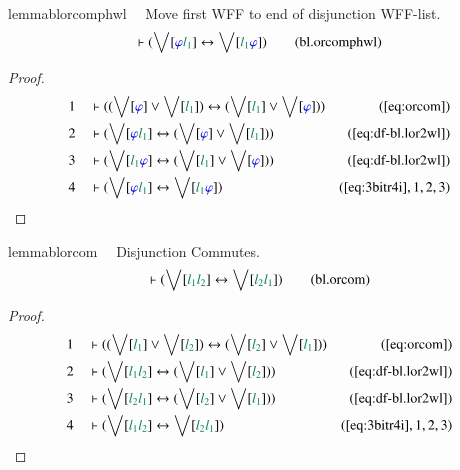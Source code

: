 \begin{restatable}{lemma}{blorcomphwl}~~ Move first WFF to end of disjunction
WFF-list.
\begin{align}
\vdash ( \bigvee[ \mw{\varphi} \mwl{l_1} ] \leftrightarrow \bigvee[ \mwl{l_1}
    \mw{\varphi} ] )\label{eq:bl.orcomphwl}\tag{bl.orcomphwl}
\end{align}
\end{restatable}

\begin{proof}
\begin{align}
  1 &&  & \vdash ( ( \bigvee[ \mw{\varphi} ] \vee \bigvee[ \mwl{l_1} ] )
      \leftrightarrow ( \bigvee[ \mwl{l_1} ] \vee \bigvee[
      \mw{\varphi} ] ) )&(\mbox{\ref{eq:orcom}})\notag
  \\ 2 &&  & \vdash ( \bigvee[ \mw{\varphi} \mwl{l_1} ] \leftrightarrow (
      \bigvee[ \mw{\varphi} ] \vee \bigvee[ \mwl{l_1} ] )
      )&(\mbox{\ref{eq:df-bl.lor2wl}})\notag
  \\ 3 &&  & \vdash ( \bigvee[ \mwl{l_1} \mw{\varphi} ] \leftrightarrow (
      \bigvee[ \mwl{l_1} ] \vee \bigvee[ \mw{\varphi} ] )
      )&(\mbox{\ref{eq:df-bl.lor2wl}})\notag
  \\ 4 &&  & \vdash ( \bigvee[ \mw{\varphi} \mwl{l_1} ] \leftrightarrow
      \bigvee[ \mwl{l_1} \mw{\varphi} ]
      )&(\mbox{\ref{eq:3bitr4i}},1,2,3)\notag
\end{align}
\end{proof}

\begin{restatable}{lemma}{blorcom}~~ Disjunction Commutes.
\begin{align}
\vdash ( \bigvee[ \mwl{l_1} \mwl{l_2} ] \leftrightarrow \bigvee[ \mwl{l_2}
    \mwl{l_1} ] )\label{eq:bl.orcom}\tag{bl.orcom}
\end{align}
\end{restatable}

\begin{proof}
\begin{align}
  1 &&  & \vdash ( ( \bigvee[ \mwl{l_1} ] \vee \bigvee[ \mwl{l_2} ] )
      \leftrightarrow ( \bigvee[ \mwl{l_2} ] \vee \bigvee[
      \mwl{l_1} ] ) )&(\mbox{\ref{eq:orcom}})\notag
  \\ 2 &&  & \vdash ( \bigvee[ \mwl{l_1} \mwl{l_2} ] \leftrightarrow ( \bigvee[
      \mwl{l_1} ] \vee \bigvee[ \mwl{l_2} ] )
      )&(\mbox{\ref{eq:df-bl.lor2wl}})\notag
  \\ 3 &&  & \vdash ( \bigvee[ \mwl{l_2} \mwl{l_1} ] \leftrightarrow ( \bigvee[
      \mwl{l_2} ] \vee \bigvee[ \mwl{l_1} ] )
      )&(\mbox{\ref{eq:df-bl.lor2wl}})\notag
  \\ 4 &&  & \vdash ( \bigvee[ \mwl{l_1} \mwl{l_2} ] \leftrightarrow \bigvee[
      \mwl{l_2} \mwl{l_1} ]
      )&(\mbox{\ref{eq:3bitr4i}},1,2,3)\notag
\end{align}
\end{proof}

